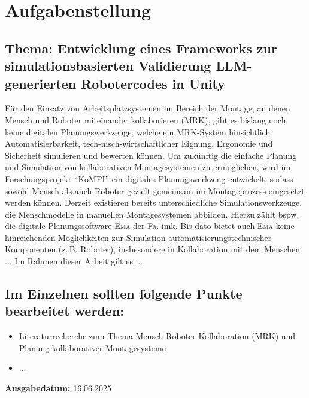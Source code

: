 \chapter*{Aufgabenstellung}
\label{cap:Aufgabenstellung}


\section*{Thema: Entwicklung eines Frameworks zur simulationsbasierten Validierung LLM-generierten Robotercodes in Unity}
\label{sec:Thema: Entwicklung eines Frameworks zur simulationsbasierten Validierung LLM-generierten Robotercodes in Unity}
 
Für den Einsatz von Arbeitsplatzsystemen im Bereich der Montage, an denen Mensch und Roboter miteinander kollaborieren (MRK), gibt es bislang noch keine digitalen Planungswerkzeuge, welche ein MRK-System hinsichtlich Automatisierbarkeit, tech-nisch-wirtschaftlicher Eignung, Ergonomie und Sicherheit simulieren und bewerten können.
Um zukünftig die einfache Planung und Simulation von kollaborativen Montagesystemen zu ermöglichen, wird im Forschungsprojekt "`KoMPI"' ein digitales Planungswerkzeug entwickelt, sodass sowohl Mensch als auch Roboter gezielt gemeinsam im Montageprozess eingesetzt werden können.
Derzeit existieren bereits unterschiedliche Simulationswerkzeuge, die Menschmodelle in manuellen Montagesystemen abbilden.
Hierzu zählt bspw. die digitale Planungssoftware \textsc{Ema} der Fa. imk.
Bis dato bietet auch \textsc{Ema} keine hinreichenden Möglichkeiten zur Simulation automatisierungstechnischer Komponenten (z.\,B. Roboter), insbesondere in Kollaboration mit dem Menschen.
...
Im Rahmen dieser Arbeit gilt es ...


\section*{Im Einzelnen sollten folgende Punkte bearbeitet werden:}
\label{sec:Im Einzelnen sollten folgende Punkte bearbeitet werden:}
 
\begin{itemize}
	\item Literaturrecherche zum Thema Mensch-Roboter-Kollaboration (MRK) und Planung kollaborativer Montagesysteme
	\item ...
\end{itemize}

 
\textbf{Ausgabedatum:} 16.06.2025
